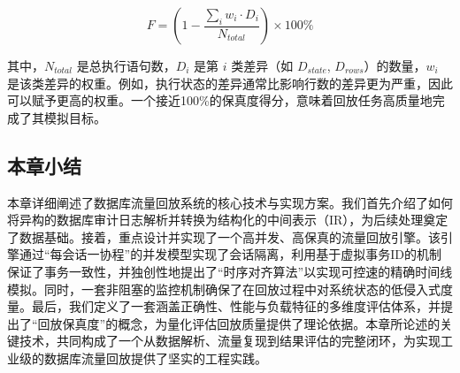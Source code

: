 \begin{equation}
\label{eq:fidelity}
F = \left(1 - \frac{\sum_{i} w_i \cdot D_i}{N_{total}}\right) \times 100\%
\end{equation}

其中，$N_{total}$ 是总执行语句数，$D_i$ 是第 $i$ 类差异（如 $D_{state}$, $D_{rows}$）的数量，$w_i$ 是该类差异的权重。例如，执行状态的差异通常比影响行数的差异更为严重，因此可以赋予更高的权重。一个接近100\%的保真度得分，意味着回放任务高质量地完成了其模拟目标。

\subsection{本章小结}
\label{sec:chapter_summary}
本章详细阐述了数据库流量回放系统的核心技术与实现方案。我们首先介绍了如何将异构的数据库审计日志解析并转换为结构化的中间表示（IR），为后续处理奠定了数据基础。接着，重点设计并实现了一个高并发、高保真的流量回放引擎。该引擎通过“每会话一协程”的并发模型实现了会话隔离，利用基于虚拟事务ID的机制保证了事务一致性，并独创性地提出了“时序对齐算法”以实现可控速的精确时间线模拟。同时，一套非阻塞的监控机制确保了在回放过程中对系统状态的低侵入式度量。最后，我们定义了一套涵盖正确性、性能与负载特征的多维度评估体系，并提出了“回放保真度”的概念，为量化评估回放质量提供了理论依据。本章所论述的关键技术，共同构成了一个从数据解析、流量复现到结果评估的完整闭环，为实现工业级的数据库流量回放提供了坚实的工程实践。

